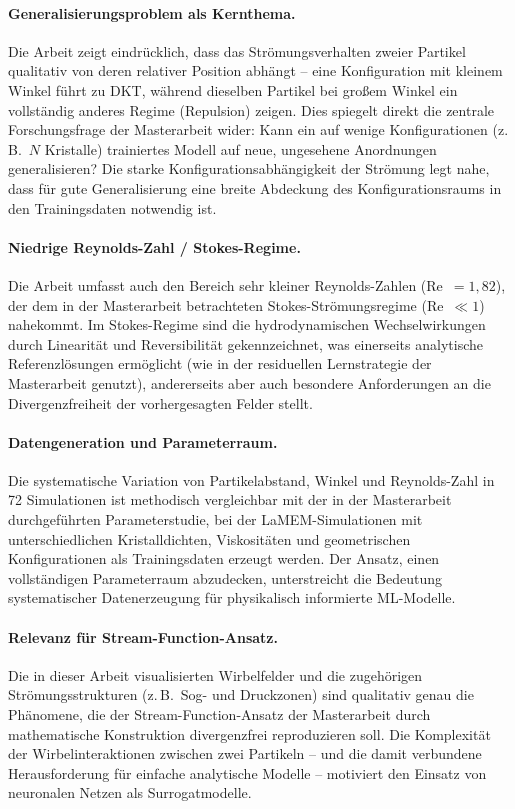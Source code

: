 \documentclass[a4paper,12pt]{article}
\begin{document}
\paragraph{Generalisierungsproblem als Kernthema.}
Die Arbeit zeigt eindrücklich, dass das Strömungsverhalten zweier Partikel qualitativ von deren relativer Position abhängt -- eine Konfiguration mit kleinem Winkel führt zu DKT, während dieselben Partikel bei großem Winkel ein vollständig anderes Regime (Repulsion) zeigen. Dies spiegelt direkt die zentrale Forschungsfrage der Masterarbeit wider: Kann ein auf wenige Konfigurationen (z.\,B.\ $N$ Kristalle) trainiertes Modell auf neue, ungesehene Anordnungen generalisieren? Die starke Konfigurationsabhängigkeit der Strömung legt nahe, dass für gute Generalisierung eine breite Abdeckung des Konfigurationsraums in den Trainingsdaten notwendig ist.

\paragraph{Niedrige Reynolds-Zahl / Stokes-Regime.}
Die Arbeit umfasst auch den Bereich sehr kleiner Reynolds-Zahlen (Re~$= 1{,}82$), der dem in der Masterarbeit betrachteten Stokes-Strömungsregime (Re~$\ll 1$) nahekommt. Im Stokes-Regime sind die hydrodynamischen Wechselwirkungen durch Linearität und Reversibilität gekennzeichnet, was einerseits analytische Referenzlösungen ermöglicht (wie in der residuellen Lernstrategie der Masterarbeit genutzt), andererseits aber auch besondere Anforderungen an die Divergenzfreiheit der vorhergesagten Felder stellt.

\paragraph{Datengeneration und Parameterraum.}
Die systematische Variation von Partikelabstand, Winkel und Reynolds-Zahl in 72 Simulationen ist methodisch vergleichbar mit der in der Masterarbeit durchgeführten Parameterstudie, bei der LaMEM-Simulationen mit unterschiedlichen Kristalldichten, Viskositäten und geometrischen Konfigurationen als Trainingsdaten erzeugt werden. Der Ansatz, einen vollständigen Parameterraum abzudecken, unterstreicht die Bedeutung systematischer Datenerzeugung für physikalisch informierte ML-Modelle.

\paragraph{Relevanz für Stream-Function-Ansatz.}
Die in dieser Arbeit visualisierten Wirbelfelder und die zugehörigen Strömungsstrukturen (z.\,B.\ Sog- und Druckzonen) sind qualitativ genau die Phänomene, die der Stream-Function-Ansatz der Masterarbeit durch mathematische Konstruktion divergenzfrei reproduzieren soll. Die Komplexität der Wirbelinteraktionen zwischen zwei Partikeln -- und die damit verbundene Herausforderung für einfache analytische Modelle -- motiviert den Einsatz von neuronalen Netzen als Surrogatmodelle.
\end{document}
